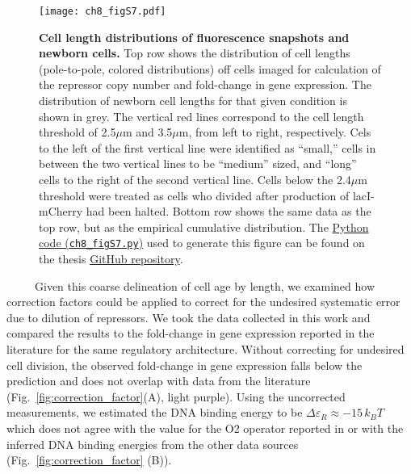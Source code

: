 \documentclass[12pt]{caltech_thesis}
\begin{document}
\hypertarget{fig:length_distributions}{%
\begin{figure}
\centering
\texttt{[image: ch8\_figS7.pdf]}
\caption[{Cell length distributions of fluorescence snapshots and
newborn cells.}]{\textbf{Cell length distributions of fluorescence
snapshots and newborn cells.} Top row shows the distribution of cell
lengths (pole-to-pole, colored distributions) off cells imaged for
calculation of the repressor copy number and fold-change in gene
expression. The distribution of newborn cell lengths for that given
condition is shown in grey. The vertical red lines correspond to the
cell length threshold of 2.5\(\mu\)m and 3.5\(\mu\)m, from left to
right, respectively. Cels to the left of the first vertical line were
identified as ``small,'' cells in between the two vertical lines to be
``medium'' sized, and ``long'' cells to the right of the second vertical
line. Cells below the 2.4\(\mu\)m threshold were treated as cells who
divided after production of lacI-mCherry had been halted. Bottom row
shows the same data as the top row, but as the empirical cumulative
distribution. The
\href{https://github.com/gchure/phd/blob/master/src/chapter_08/code/ch8_figS7.py}{Python
code (\texttt{ch8\_figS7.py})} used to generate this figure can be found
on the thesis \href{https://github.com/gchure/phd}{GitHub repository}.}
\label{fig:length_distributions}
\end{figure}
}

~~~~~Given this coarse delineation of cell age by length, we examined
how correction factors could be applied to correct for the undesired
systematic error due to dilution of repressors. We took the data
collected in this work and compared the results to the fold-change in
gene expression reported in the literature for the same regulatory
architecture. Without correcting for undesired cell division, the
observed fold-change in gene expression falls below the prediction and
does not overlap with data from the literature
(Fig.~\ref{fig:correction_factor}(A), light purple). Using the
uncorrected measurements, we estimated the DNA binding energy to be
\(\Delta\varepsilon_R \approx -15\, k_BT\) which does not agree with the
value for the O2 operator reported in \textcite{garcia2011} or with the
inferred DNA binding energies from the other data sources
(Fig.~\ref{fig:correction_factor} (B)).
\end{document}
